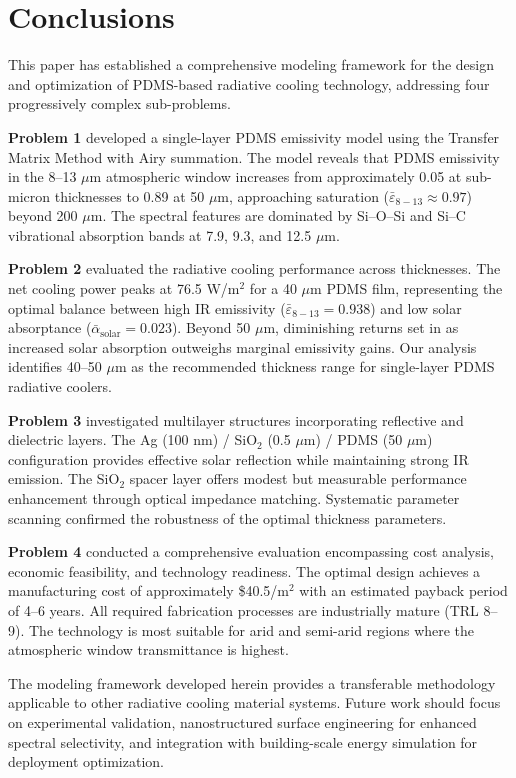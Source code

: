 \section{Conclusions}

This paper has established a comprehensive modeling framework for the design and optimization of PDMS-based radiative cooling technology, addressing four progressively complex sub-problems.

\textbf{Problem 1} developed a single-layer PDMS emissivity model using the Transfer Matrix Method with Airy summation. The model reveals that PDMS emissivity in the 8--13 $\mu$m atmospheric window increases from approximately 0.05 at sub-micron thicknesses to 0.89 at 50 $\mu$m, approaching saturation ($\bar{\varepsilon}_{8-13} \approx 0.97$) beyond 200 $\mu$m. The spectral features are dominated by Si--O--Si and Si--C vibrational absorption bands at 7.9, 9.3, and 12.5 $\mu$m.

\textbf{Problem 2} evaluated the radiative cooling performance across thicknesses. The net cooling power peaks at 76.5 W/m$^2$ for a 40 $\mu$m PDMS film, representing the optimal balance between high IR emissivity ($\bar{\varepsilon}_{8-13}=0.938$) and low solar absorptance ($\bar{\alpha}_{\text{solar}}=0.023$). Beyond 50 $\mu$m, diminishing returns set in as increased solar absorption outweighs marginal emissivity gains. Our analysis identifies 40--50 $\mu$m as the recommended thickness range for single-layer PDMS radiative coolers.

\textbf{Problem 3} investigated multilayer structures incorporating reflective and dielectric layers. The Ag (100 nm) / SiO$_2$ (0.5 $\mu$m) / PDMS (50 $\mu$m) configuration provides effective solar reflection while maintaining strong IR emission. The SiO$_2$ spacer layer offers modest but measurable performance enhancement through optical impedance matching. Systematic parameter scanning confirmed the robustness of the optimal thickness parameters.

\textbf{Problem 4} conducted a comprehensive evaluation encompassing cost analysis, economic feasibility, and technology readiness. The optimal design achieves a manufacturing cost of approximately \$40.5/m$^2$ with an estimated payback period of 4--6 years. All required fabrication processes are industrially mature (TRL 8--9). The technology is most suitable for arid and semi-arid regions where the atmospheric window transmittance is highest.

The modeling framework developed herein provides a transferable methodology applicable to other radiative cooling material systems. Future work should focus on experimental validation, nanostructured surface engineering for enhanced spectral selectivity, and integration with building-scale energy simulation for deployment optimization.

